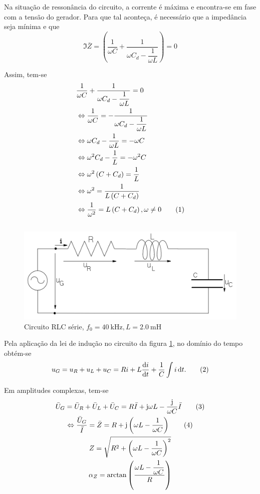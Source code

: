 \documentclass[a4paper, titlepage, portuguese]{article}
\newcommand{\eq}{\Leftrightarrow} %
\newcommand\numberthis{\addtocounter{equation}{1}\tag{\theequation}}
\begin{document}
		\par
		Na situação de ressonância do circuito, a corrente é máxima e encontra-se em fase com a tensão do gerador. Para que tal aconteça, é necessário que a impedância seja mínima e que
		\begin{equation}
			\Im{\bar{Z}} = \left(\dfrac{1}{\omega C} + \dfrac{1}{\omega C_d - \dfrac{1}{\omega L}}\right) = 0
		\end{equation}
		\par
		Assim, tem-se
		\begin{align*}
			&\dfrac{1}{\omega C} + \dfrac{1}{\omega C_d - \dfrac{1}{\omega L}} = 0 \\
			&\Leftrightarrow \dfrac{1}{\omega C} = - \dfrac{1}{\omega C_d - \dfrac{1}{\omega L}} \\
			&\Leftrightarrow \omega C_d - \dfrac{1}{\omega L} = -\omega C \\
			&\Leftrightarrow \omega^2 C_d - \dfrac{1}{L} = -\omega^2 C \\
			&\Leftrightarrow \omega^2 \left(C + C_d \right) = \dfrac{1}{L} \\
			&\Leftrightarrow \omega^2 = \dfrac{1}{L\left(C + C_d \right)} \\
			&\Leftrightarrow \dfrac{1}{\omega^2} = L\left(C + C_d \right), \omega \neq 0 \numberthis
		\end{align*}

	\subsection{}
		\begin{figure}[h]
			\centering
			\includegraphics[width=0.6\linewidth]{circuito1.png}
			\caption{Circuito RLC série, $f_0 = \SI{40}{\kilo\hertz}, L = \SI{2,0}{\milli\henry}$ }
			\label{fig:circuito1}
		\end{figure}
		\par
		Pela aplicação da lei de indução no circuito da figura \ref{fig:circuito1}, no domínio do tempo obtém-se
		\begin{equation*}
			u_G = u_R + u_L + u_C = Ri + L\dv{i}{t} + \dfrac{1}{C} \int{i\dd{t}}. \numberthis
		\end{equation*}
		\par
		Em amplitudes complexas, tem-se
		\begin{gather*}
			\bar{U}_G = \bar{U}_R + \bar{U}_L + \bar{U}_C = R\bar{I} + \mathrm{j} \omega L - \dfrac{\mathrm{j}}{\omega C}\bar{I} \numberthis \\
			\eq \dfrac{\bar{U}_G}{\bar{I}} = \bar{Z} = R + \mathrm{j}\left(\omega L - \dfrac{1}{\omega C}\right) \numberthis \\
			Z = \sqrt{R^2 + \left(\omega L - \dfrac{1}{\omega C}\right)^2} \\
			\alpha_Z = \arctan{\left(\dfrac{\omega L - \dfrac{1}{\omega C}}{R}\right)}
		\end{gather*}
\end{document}
